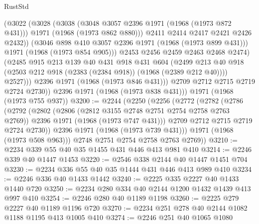 \begin{lexlean}{RustStd}
\begin{coremodule}
                    (@3022
                      (@3028
                        (@3038
                          (@3048 @3057 @2396 @1971 (@1968 (@1973 @872 @431)))
                          @1971
                          (@1968 (@1973 @862 @880)))
                        @2411
                        @2414
                        @2417
                        @2421
                        @2426
                        @2432))
                    (@3046 @898 @410 @3057 @2396 @1971 (@1968 (@1973 @899 @431)))
                    @1971
                    (@1968 (@1973 @854 @905)))
                  @2453
                  @2456
                  @2459
                  @2463
                  @2468
                  @2474)
                (@2485
                  @915
                  @213
                  @139
                  @40
                  @431
                  @918
                  @431
                  @604
                  (@2499
                    @213
                    @40
                    @918
                    (@2503 @212 @918 (@2383 (@2384 @918)) (@1968 (@2389 @212 @40))))
                  @2527)))
            @2396
            @1971
            (@1968 (@1973 @846 @431)))
          @2709
          @2712
          @2715
          @2719
          @2724
          @2730))
      @2396
      @1971
      (@1968 (@1973 @838 @431)))
    @1971
    (@1968 (@1973 @755 @937))
@3200 := @2244
    (@2250
      (@2256
        (@2772
          (@2782
            (@2786
              (@2792
                (@2802
                  (@2806 (@2812 @3155 @2748 @2751 @2754 @2758 @2763 @2769))
                  @2396
                  @1971
                  (@1968 (@1973 @747 @431)))
                @2709
                @2712
                @2715
                @2719
                @2724
                @2730))
            @2396
            @1971
            (@1968 (@1973 @739 @431)))
          @1971
          (@1968 (@1973 @508 @963)))
        @2748
        @2751
        @2754
        @2758
        @2763
        @2769))
@3210 := @2234 @339 @55 @40 @35 @1455 @431 @446 @413 @981 @410
@3214 := @2246 @339 @40 @1447 @1453
@3220 := @2546 @338 @2144 @40 @1447 @1451 @704
@3230 := @2234 @336 @55 @40 @35 @1444 @431 @446 @413 @989 @410
@3234 := @2246 @336 @40 @1433 @1442
@3240 := @2225 @335 @2227 @40 @1433 @1440 @720
@3250 := @2234 @280 @334 @40 @2144 @1200 @1432 @1439 @413 @997 @410
@3254 := @2246 @280 @40 @1189 @1198
@3260 := @2225 @279 @2227 @40 @1189 @1196 @720
@3270 := @2234 @251 @278 @40 @2144 @1082 @1188 @1195 @413 @1005 @410
@3274 := @2246 @251 @40 @1065 @1080

\end{coremodule}
\end{lexlean}
